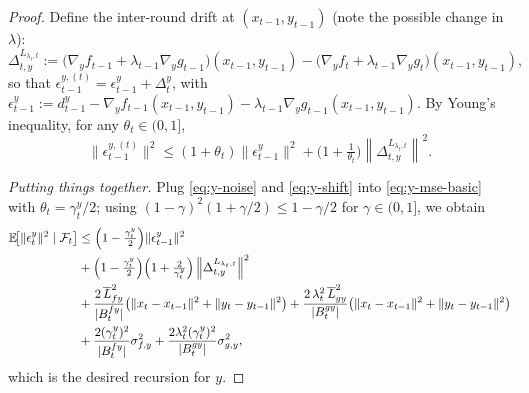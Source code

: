 \documentclass{uai2026} %
\newcommand{\EE}{\mathbb{E}}
\newcommand{\F}{\mathcal{F}}
\begin{document}
\begin{proof}
Define the inter-round drift at $(x_{t-1},y_{t-1})$ (note the possible change in $\lambda$):
\[
\Delta_{t,y}^{L_{\lambda_{t},t}}:=\big(\nabla_y f_{t-1}+\lambda_{t-1}\nabla_y g_{t-1}\big)(x_{t-1},y_{t-1})
-\big(\nabla_y f_t+\lambda_{t-1}\nabla_y g_t\big)(x_{t-1},y_{t-1}),
\]
so that $\epsilon_{t-1}^{y,(t)}=\epsilon_{t-1}^y+\Delta_t^y$, with
$\epsilon_{t-1}^y:=d_{t-1}^y-\nabla_y f_{t-1}(x_{t-1},y_{t-1})-\lambda_{t-1}\nabla_y g_{t-1}(x_{t-1},y_{t-1})$.
By Young’s inequality, for any $\theta_t\in(0,1]$,
\begin{equation}\label{eq:y-shift}
\|\epsilon_{t-1}^{y,(t)}\|^2\le(1+\theta_t)\|\epsilon_{t-1}^y\|^2+\Big(1+\tfrac{1}{\theta_t}\Big)\left\|\Delta_{t,y}^{L_{\lambda_{t},t}}\right\|^2.
\end{equation}

\noindent\textit{Putting things together.}
Plug \eqref{eq:y-noise} and \eqref{eq:y-shift} into \eqref{eq:y-mse-basic} with $\theta_t=\gamma_t^y/2$; using
$(1-\gamma)^2(1+\gamma/2)\le 1-\gamma/2$ for $\gamma\in(0,1]$, we obtain
\begin{align}
\EE\!\big[\|\epsilon_t^y\|^2\mid\F_t\big]
&\le \Big(1-\tfrac{\gamma_t^y}{2}\Big)\|\epsilon_{t-1}^y\|^2\nonumber\\
&+ \Big(1-\tfrac{\gamma_t^y}{2}\Big)\Big(1+\tfrac{2}{\gamma_t^y}\Big)\left\|\Delta_{t,y}^{L_{\lambda_{t},t}}\right\|^{2} \notag\\
& + \frac{2\,\overline L_{fy}^2}{|B_t^{fy}|}\big(\|x_t-x_{t-1}\|^2+\|y_t-y_{t-1}\|^2\big)
+ \frac{2\,\lambda_t^2\,\overline L_{gy}^2}{|B_t^{gy}|}\big(\|x_t-x_{t-1}\|^2+\|y_t-y_{t-1}\|^2\big) \notag\\
& + \frac{2(\gamma_t^y)^2}{|B_t^{fy}|}\sigma_{f,y}^2
+ \frac{2\lambda_t^2(\gamma_t^y)^2}{|B_t^{gy}|}\sigma_{g,y}^2,
\label{eq:vrES-y}
\end{align}
which is the desired recursion for $y$.


\end{proof}
\end{document}
